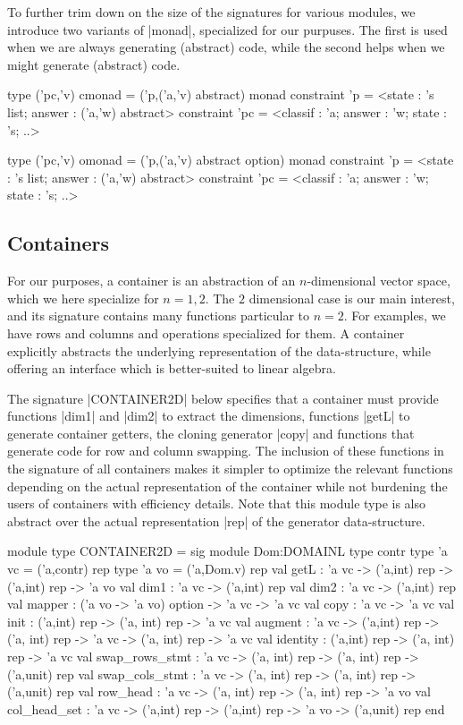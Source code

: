 \documentclass{elsart}
\begin{document}
To further trim down on the size of the signatures for various modules,
we introduce two variants of |monad|, specialized for our purpuses.  The
first is used when we are always generating (abstract) code, while the second
helps when we might generate (abstract) code.
\begin{code}
type ('pc,'v) cmonad = 
  ('p,('a,'v) abstract) monad
    constraint
      'p = <state : 's list; answer : ('a,'w) abstract>
    constraint
      'pc = <classif : 'a; answer : 'w; state : 's; ..>
       
type ('pc,'v) omonad = 
  ('p,('a,'v) abstract option) monad
    constraint
      'p = <state : 's list; answer : ('a,'w) abstract>
    constraint
      'pc = <classif : 'a; answer : 'w; state : 's; ..>
\end{code}
\subsection{Containers}

For our purposes, a container is an abstraction of an $n$-dimensional
vector space, which we here specialize for $n=1,2$.  The $2$ dimensional
case is our main interest, and its signature contains many functions particular
to $n=2$.  For examples, we have rows and columns and operations specialized
for them.  A container explicitly abstracts the underlying representation 
of the data-structure, while offering an interface which is better-suited
to linear algebra.

The signature |CONTAINER2D| below specifies that a container must provide
functions |dim1| and |dim2| to extract the dimensions, functions |getL|
to generate container getters, the cloning
generator |copy| and functions that generate code for row and column
swapping. The inclusion of these functions in the signature of all
containers makes it simpler to optimize the relevant functions
depending on the actual representation of the container while not
burdening the users of containers with efficiency details.  Note that
this module type is also abstract over the actual representation 
|rep| of the generator data-structure.

\begin{code}
module type CONTAINER2D = sig
  module Dom:DOMAINL
  type contr
  type 'a vc = ('a,contr) rep
  type 'a vo = ('a,Dom.v) rep
  val getL : 'a vc -> ('a,int) rep -> ('a,int) rep -> 'a vo
  val dim1 : 'a vc -> ('a,int) rep
  val dim2 : 'a vc -> ('a,int) rep
  val mapper : ('a vo -> 'a vo) option -> 'a vc -> 'a vc
  val copy : 'a vc -> 'a vc
  val init : ('a,int) rep -> ('a, int) rep -> 'a vc
  val augment : 'a vc -> ('a,int) rep -> ('a, int) rep -> 'a vc ->
                ('a, int) rep -> 'a vc
  val identity : ('a,int) rep -> ('a, int) rep -> 'a vc
  val swap_rows_stmt : 'a vc -> ('a, int) rep -> ('a, int) rep -> 
                       ('a,unit) rep
  val swap_cols_stmt : 'a vc -> ('a, int) rep -> ('a, int) rep -> 
                       ('a,unit) rep
  val row_head : 'a vc -> ('a, int) rep -> ('a, int) rep -> 'a vo
  val col_head_set : 'a vc -> ('a,int) rep -> ('a,int) rep -> 'a vo -> 
            ('a,unit) rep
end
\end{code}
\end{document}
